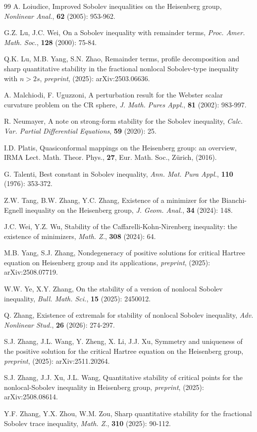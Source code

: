 \documentclass[11pt]{article}
\begin{document}
\begin{thebibliography}{99}
 A. Loiudice,
Improved Sobolev inequalities on the Heisenberg group,
{\em Nonlinear Anal.},
{\bf 62} (2005): 953-962.

G.Z. Lu, J.C. Wei,  On a Sobolev inequality with remainder terms, {\em Proc. Amer. Math. Soc.}, \textbf{128} (2000): 75-84.

 Q.K. Lu, M.B. Yang, S.N. Zhao,
Remainder terms, profile decomposition and sharp quantitative stability in the fractional
nonlocal Sobolev-type inequality with $n>2s$, {\em preprint}, (2025): arXiv:2503.06636.

 A. Malchiodi, F. Uguzzoni,
A perturbation result for the Webster scalar curvature problem on the CR sphere,
{\em J. Math. Pures Appl.}, {\bf 81} (2002): 983-997.


 R. Neumayer,
A note on strong-form stability for the Sobolev inequality,
{\em Calc. Var. Partial Differential Equations}, {\bf 59} (2020): 25.

 I.D. Platis,
Quasiconformal mappings on the Heisenberg group: an overview,
IRMA Lect. Math. Theor. Phys., {\bf 27}, Eur. Math. Soc., Z\"{u}rich, (2016).



  G. Talenti,
Best constant in Sobolev inequality, {\em Ann. Mat. Pura Appl.}, {\bf 110} (1976): 353-372.

 Z.W. Tang, B.W. Zhang, Y.C. Zhang,
Existence of a minimizer for the Bianchi-Egnell inequality on the Heisenberg group,
{\em J. Geom. Anal.}, {\bf 34} (2024): 148.


 J.C. Wei, Y.Z. Wu,
Stability of the Caffarelli-Kohn-Nirenberg inequality: the existence of minimizers,
{\em Math. Z.}, {\bf 308} (2024): 64.

 M.B. Yang, S.J. Zhang,
Nondegeneracy of positive solutions for critical Hartree equation on Heisenberg group and its applications,
{\em preprint}, (2025): arXiv:2508.07719.

 W.W. Ye, X.Y. Zhang,
On the stability of a version of nonlocal Sobolev inequality, {\em Bull. Math. Sci.}, {\bf 15} (2025): 2450012.


 Q. Zhang,
Existence of extremals for stability of nonlocal Sobolev inequality,
{\em Adv. Nonlinear Stud.}, {\bf 26} (2026): 274-297.



S.J. Zhang, J.L. Wang, Y. Zheng, X. Li, J.J. Xu,
Symmetry and uniqueness of the positive solution for the critical Hartree equation on the Heisenberg group, {\em preprint}, (2025): arXiv:2511.20264.


 S.J. Zhang, J.J. Xu, J.L. Wang,
Quantitative stability of critical points for the nonlocal-Sobolev inequality in Heisenberg group,
{\em preprint}, (2025): arXiv:2508.08614.

 Y.F. Zhang, Y.X. Zhou, W.M. Zou,
Sharp quantitative stability for the fractional Sobolev trace inequality,
{\em Math. Z.}, {\bf 310}
(2025): 90-112.



\end{thebibliography}
\end{document}
